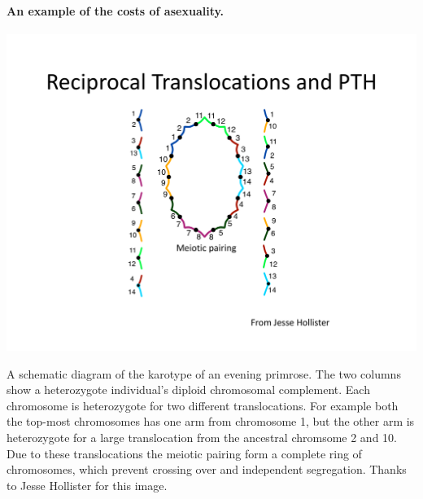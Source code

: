 \paragraph{An example of the costs of asexuality.}


\begin{marginfigure}[-3cm]
\begin{center}
  \includegraphics[width = \textwidth]{figures/Reciprocal_translocations_Hollister.pdf}
\end{center}
\caption{A schematic diagram of the karotype of an evening primrose. The two columns show a heterozygote individual's diploid chromosomal complement. Each chromosome is heterozygote for two different translocations. For example both the top-most chromosomes has one arm from chromosome 1, but the other arm is heterozygote for a large translocation from the ancestral chromsome 2 and 10. Due to these translocations the meiotic pairing form a complete ring of chromosomes, which prevent crossing over and independent segregation. Thanks to Jesse Hollister for this image. } \label{}  %
\end{marginfigure}

